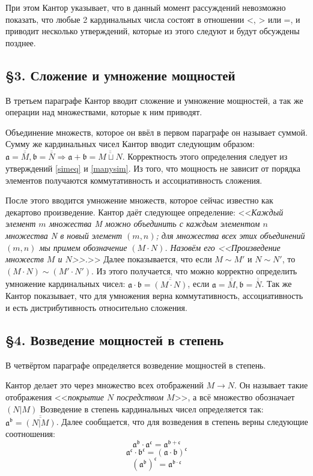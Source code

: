 \documentclass[a4paper,12pt]{extarticle}
\theoremstyle{definition}
\newcommand{\cit}[1]{<<\textit{#1}>>}
\newcommand{\car}[1]{\overline{\overline{#1}}}
\begin{document}
При этом Кантор указывает, что в данный момент рассуждений невозможно показать, что любые 2 кардинальных числа состоят в отношении <, > или =,
и приводит несколько утверждений, которые из этого следуют и будут обсуждены позднее.

\subsection{\S 3. Сложение и умножение мощностей}
В третьем параграфе Кантор вводит сложение и умножение мощностей, а так же операции над множествами, которые к ним приводят.

Объединение множеств, которое он ввёл в первом параграфе он называет суммой.
Сумму же кардинальных чисел Кантор вводит следующим образом: $\mathfrak{a} = \car{M}, \mathfrak{b} = \car{N} \Rightarrow \mathfrak{a + b} = \car{M \sqcup N}$.
Корректность этого определения следует из утверждений \ref{simeq} и \ref{manysim}.
Из того, что мощность не зависит от порядка элементов получаются коммутативность и ассоциативность сложения.

После этого вводится умножение множеств, которое сейчас известно как декартово произведение.
Кантор даёт следующее определение: \cit{Каждый элемент $m$ множества M можно объединить с каждым элементом $n$ множества N в новый элемент $(m, n)$;
для множества всех этих объединений $(m, n)$ мы примем обозначение $(M \cdot N)$. Назовём его <<\textnormal{Произведение множеств $M$ и $N$}>>.}
Далее показывается, что если $M \sim M'$ и $N \sim N'$, то $(M \cdot N) \sim (M' \cdot N')$.
Из этого получается, что можно корректно определить умножение кардинальных чисел: $\mathfrak{a \cdot b} = \car{(M \cdot N)}$, если $\mathfrak{a} = \car{M}, \mathfrak{b} = \car{N}$.
Так же Кантор показывает, что для умножения верна коммутативность, ассоциативность и есть дистрибутивность относительно сложения.

\subsection{\S 4. Возведение мощностей в степень}
В четвёртом параграфе определяется возведение мощностей в степень.

Кантор делает это через множество всех отображений $M \rightarrow N$.
Он называет такие отображения \cit{покрытие $N$ посредством $M$}, а всё множество обозначает $(N|M)$
Возведение в степень кардинальных чисел определяется так: $\mathfrak{a^b} = \car{(N|M)}$.
Далее сообщается, что для возведения в степень верны следующие соотношения:
$$\mathfrak{a^b \cdot a^c = a^{b+c}}$$
$$\mathfrak{a^c \cdot b^c = (a \cdot b)^c}$$
$$\mathfrak{(a^b)^c = a^{b \cdot c}}$$
\end{document}

